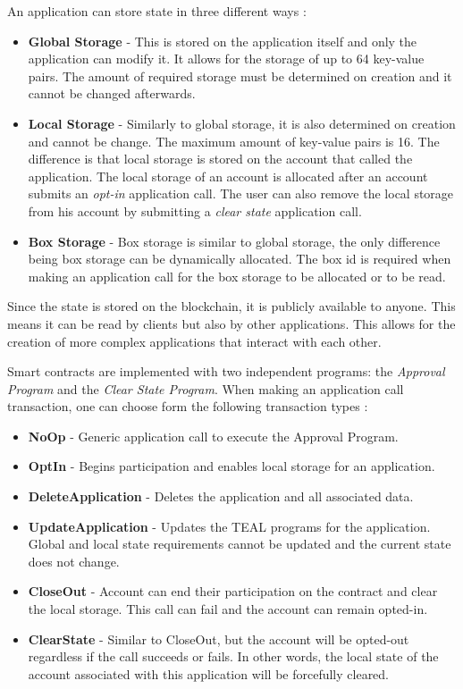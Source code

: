An application can store state in three different ways \cite{noauthor_contract_nodate}:
\begin{itemize}
    \item \textbf{Global Storage} - This is stored on the application itself and only the application can modify it. It allows for the storage of up to 64 key-value pairs. The amount of required storage must be determined on creation and it cannot be changed afterwards.
    \item \textbf{Local Storage} - Similarly to global storage, it is also determined on creation and cannot be change. The maximum amount of key-value pairs is 16. The difference is that local storage is stored on the account that called the application. The local storage of an account is allocated after an account submits an \textit{opt-in} application call. The user can also remove the local storage from his account by submitting a \textit{clear state} application call.
    \item \textbf{Box Storage} - Box storage is similar to global storage, the only difference being box storage can be dynamically allocated. The box id is required when making an application call for the box storage to be allocated or to be read.
\end{itemize}
Since the state is stored on the blockchain, it is publicly available to anyone. This means it can be read by clients but also by other applications. This allows for the creation of more complex applications that interact with each other.

Smart contracts are implemented with two independent programs: the \textit{Approval Program} and the \textit{Clear State Program}. When making an application call transaction, one can choose form the following transaction types \cite{noauthor_overview_nodate}:
\begin{itemize}
    \item \textbf{NoOp} - Generic application call to execute the Approval Program.
    \item \textbf{OptIn} - Begins participation and enables local storage for an application.
    \item \textbf{DeleteApplication} - Deletes the application and all associated data.
    \item \textbf{UpdateApplication} - Updates the \ac{TEAL} programs for the application. Global and local state requirements cannot be updated and the current state does not change.
    \item \textbf{CloseOut} - Account can end their participation on the contract and clear the local storage. This call can fail and the account can remain opted-in.
    \item \textbf{ClearState} - Similar to CloseOut, but the account will be opted-out regardless if the call succeeds or fails. In other words, the local state of the account associated with this application will be forcefully cleared.
\end{itemize}


